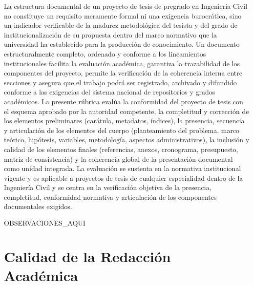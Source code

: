 \documentclass[12pt,a4paper]{report}
\begin{document}
La estructura documental de un proyecto de tesis de pregrado en Ingeniería Civil no constituye un requisito meramente formal ni una exigencia burocrática, sino un indicador verificable de la madurez metodológica del tesista y del grado de institucionalización de su propuesta dentro del marco normativo que la universidad ha establecido para la producción de conocimiento. Un documento estructuralmente completo, ordenado y conforme a los lineamientos institucionales facilita la evaluación académica, garantiza la trazabilidad de los componentes del proyecto, permite la verificación de la coherencia interna entre secciones y asegura que el trabajo podrá ser registrado, archivado y difundido conforme a las exigencias del sistema nacional de repositorios y grados académicos. La presente rúbrica evalúa la conformidad del proyecto de tesis con el esquema aprobado por la autoridad competente, la completitud y corrección de los elementos preliminares (carátula, metadatos, índices), la presencia, secuencia y articulación de los elementos del cuerpo (planteamiento del problema, marco teórico, hipótesis, variables, metodología, aspectos administrativos), la inclusión y calidad de los elementos finales (referencias, anexos, cronograma, presupuesto, matriz de consistencia) y la coherencia global de la presentación documental como unidad integrada. La evaluación se sustenta en la normativa institucional vigente y es aplicable a proyectos de tesis de cualquier especialidad dentro de la Ingeniería Civil y se centra en la verificación objetiva de la presencia, completitud, conformidad normativa y articulación de los componentes documentales exigidos.





{{OBSERVACIONES_AQUI}}


\section{Calidad de la Redacción Académica}
\end{document}
